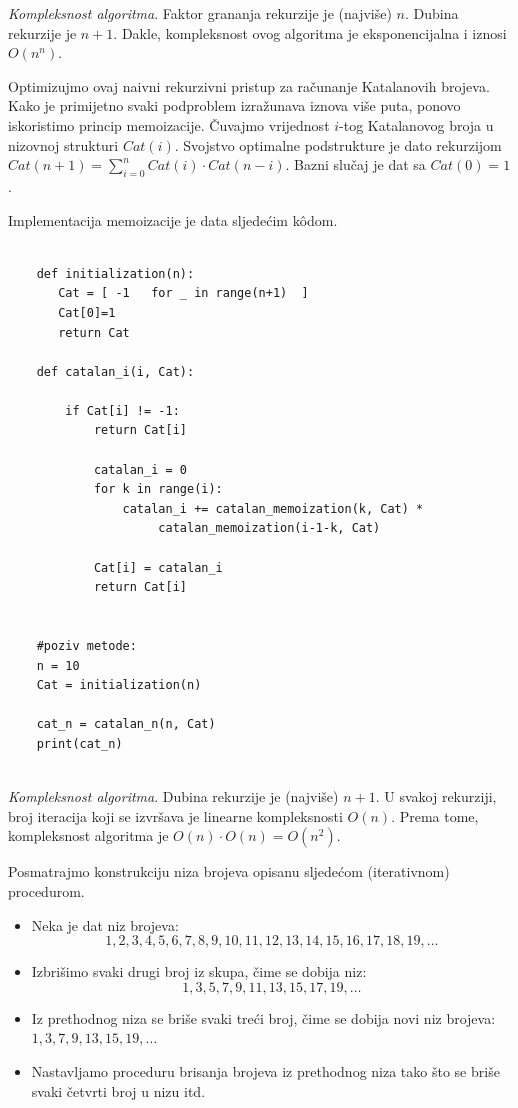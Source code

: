   \emph{Kompleksnost algoritma}. Faktor grananja rekurzije je (najviše) $n$. Dubina rekurzije je $n+1$. Dakle, kompleksnost ovog algoritma je eksponencijalna i iznosi $O(n^n)$. 

Optimizujmo ovaj naivni rekurzivni pristup za računanje Katalanovih brojeva. Kako je primijetno svaki podproblem izražunava iznova više puta, ponovo iskoristimo princip memoizacije. Čuvajmo vrijednost $i$-tog Katalano\-vog broja u nizovnoj strukturi $Cat(i)$.  Svojstvo optimalne podstrukture je dato rekurzijom $Cat(n+1) = \sum_{i=0}^{n} Cat(i) \cdot Cat(n-i).$ Bazni slučaj je dat sa $Cat(0) =1$.

Implementacija memoizacije je data sljedećim k\^odom.

  \begin{verbatim}
	
	def initialization(n):
	   Cat = [ -1   for _ in range(n+1)  ] 
	   Cat[0]=1
	   return Cat 
	
	def catalan_i(i, Cat): 
	
	    if Cat[i] != -1:
	        return Cat[i]
     
            catalan_i = 0
            for k in range(i): 
                catalan_i += catalan_memoization(k, Cat) *
                     catalan_memoization(i-1-k, Cat)
    
            Cat[i] = catalan_i
            return Cat[i]
    
	   
	#poziv metode:
	n = 10
	Cat = initialization(n) 
	
	cat_n = catalan_n(n, Cat) 
	print(cat_n)
	
\end{verbatim}  

\emph{Kompleksnost algoritma}. Dubina rekurzije je (najviše) $n+1$. U svakoj rekurziji, broj iteracija koji se izvršava je linearne kompleksnosti $O(n)$. Prema tome, kompleksnost algoritma je $O(n) \cdot O(n) = O(n^2)$. 


 
 Posmatrajmo konstrukciju niza brojeva opisanu sljedećom (iterativnom) procedurom.
 
 \begin{itemize}
 	\item Neka je dat niz brojeva:
 	$$1, 2, 3, 4, 5, 6, 7, 8, 9, 10, 11, 12, 13, 14, 15, 16, 17, 18, 19,\ldots $$
 	\item Izbrišimo svaki drugi broj iz skupa, čime se dobija niz:
 	$$1, 3, 5, 7, 9, 11, 13, 15, 17, 19,\ldots$$
 	\item Iz prethodnog niza se briše svaki treći broj, čime se dobija novi niz brojeva: $1, 3, 7, 9, 13, 15, 19,\ldots$
 	\item Nastavljamo proceduru brisanja brojeva iz prethodnog niza tako što se briše svaki četvrti broj u nizu itd.
 \end{itemize} 
 
